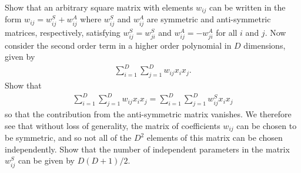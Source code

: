\begin{question}{1.14}
	Show that an arbitrary square matrix with elements $w_{ij}$ can be written in the form $w_{ij} = w_{ij}^{S} + w_{ij}^{A}$ where $w_{ij}^{S}$ and $w_{ij}^{A}$ are symmetric and anti-symmetric matrices, respectively, satisfying $w_{ij}^{S} = w_{ji}^{S}$ and $w_{ij}^{A} = -w_{ji}^{A}$ for all $i$ and $j$. Now consider the second order term in a higher order polynomial in $D$ dimensions, given by
	\begin{align*}
		\sum_{i = 1}^{D} \sum_{j = 1}^{D} w_{ij} x_i x_j.
	\end{align*}
	Show that
	\begin{align*}
		\sum_{i = 1}^{D} \sum_{j = 1}^{D} w_{ij} x_i x_j = \sum_{i = 1}^{D} \sum_{j = 1}^{D} w_{ij}^{S} x_i x_j
	\end{align*}
	so that the contribution from the anti-symmetric matrix vanishes. We therefore see that without loss of generality, the matrix of coefficients $w_{ij}$ can be chosen to be symmetric, and so not all of the $D^2$ elements of this matrix can be chosen independently. Show that the number of independent parameters in the matrix $w_{ij}^{S}$ can be given by $D(D+1)/2$.
\end{question}


